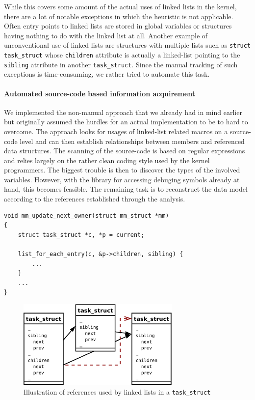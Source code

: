 While this covers some amount of the actual uses of linked lists in the kernel, there are a lot of notable exceptions in which the heuristic is not applicable.
Often entry points to linked lists are stored in global variables or structures having nothing to do with the linked list at all.
Another example of unconventional use of linked lists are structures with multiple lists such as \texttt{struct task\_struct}
whose \texttt{children} attribute is actually a linked-list pointing to the \texttt{sibling} attribute in another \texttt{task\_struct}.
Since the manual tracking of such exceptions is time-consuming, we rather tried to automate this task.

\paragraph{Automated source-code based information acquirement}
We implemented the non-manual approach that we already had in mind earlier but originally assumed the hurdles for an actual implementation to be to hard to overcome.
The approach looks for usages of linked-list related macros on a source-code level and can then establish relationships between members and referenced data structures.
The scanning of the source-code is based on regular expressions and relies largely on the rather clean coding style used by the kernel programmers.
The biggest trouble is then to discover the types of the involved variables.
However, with the library for accessing debuging symbols already at hand, this becomes feasible.
The remaining task is to reconstruct the data model according to the references established through the analysis.
\begin{lstlisting}[frame=single,caption=Linked lists referencing other types (excerpt from kernel/exit.c),label=lst:linkedliststypes]
void mm_update_next_owner(struct mm_struct *mm)
{
    struct task_struct *c, *p = current;

    list_for_each_entry(c, &p->children, sibling) {
        ...
    }
    ...
}
\end{lstlisting}
\begin{figure}[htb]
    \begin{center}
	\includegraphics[width=8cm]{imgs/task_struct_illustration-crop.pdf}
    \end{center}
	
	\caption{Illustration of references used by linked lists in a \texttt{task\_struct}}
	\label{fig:task-struct-image}
\end{figure}
